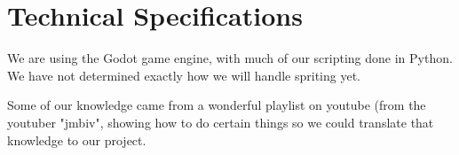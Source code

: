 \documentclass[12pt]{article}
\begin{document}
\newpage
	\section*{Technical Specifications}
	We are using the Godot game engine\cite{godot}, with much of our scripting done in Python.  We have not determined exactly how we will handle spriting yet.

	Some of our knowledge came from a wonderful playlist on youtube (from the youtuber "jmbiv"\cite{jmbiv}, showing how to do certain things so we could translate that knowledge to our project.




\end{document}
